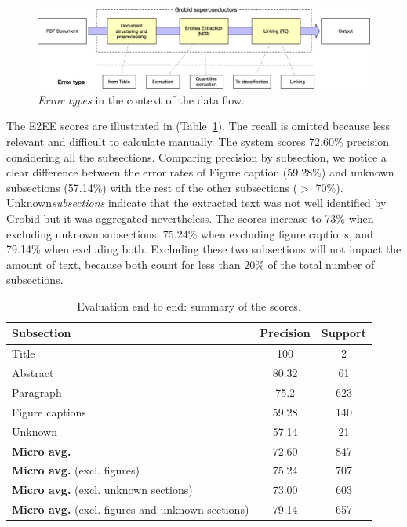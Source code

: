 \documentclass[]{interact}
\theoremstyle{plain}%
\theoremstyle{definition}
\theoremstyle{remark}
\begin{document}
\begin{figure}[ht]
\centering
\includegraphics[width=\textwidth]{error-types-colors}
\caption{\textit{Error types} in the context of the data flow. }
\label{fig:error-types}
\end{figure}

The E2EE scores are illustrated in (Table~\ref{table:end2end-evaluation-summary}). 
The recall is omitted because less relevant and difficult to calculate manually. 
The system scores 72.60\% precision considering all the subsections. 
Comparing precision by subsection, we notice a clear difference between the error rates of Figure caption (59.28\%) and unknown subsections (57.14\%) with the rest of the other subsections ($>$ 70\%). 
Unknown\textit{subsections} indicate that the extracted text was not well identified by Grobid but it was aggregated nevertheless.
The scores increase to 73\% when excluding unknown subsections, 75.24\% when excluding figure captions, and 79.14\%  when excluding both. 
Excluding these two subsections will not impact the amount of text, because both count for less than 20\% of the total number of subsections. 


\begin{table}[ht]
\centering\small
\begin{tabular}{l c c}
\toprule
\textbf{Subsection} & \textbf{Precision} & \textbf{Support} \\ 
\midrule
Title               & 100       & 2     \\
Abstract            & 80.32     & 61    \\
Paragraph           & 75.2      & 623   \\    
Figure captions     & 59.28     & 140   \\    
Unknown             & 57.14     & 21    \\
\midrule
\textbf{Micro avg.}  & 72.60     & 847   \\
\textbf{Micro avg.} (excl. figures)  & 75.24     & 707   \\ 
\textbf{Micro avg.} (excl. unknown sections)  & 73.00     & 603   \\ 
\textbf{Micro avg.} (excl. figures and unknown sections)  & 79.14     & 657   \\ 
\bottomrule
\end{tabular}
\caption{Evaluation end to end: summary of the scores. }
\label{table:end2end-evaluation-summary}
\end{table}
\end{document}
